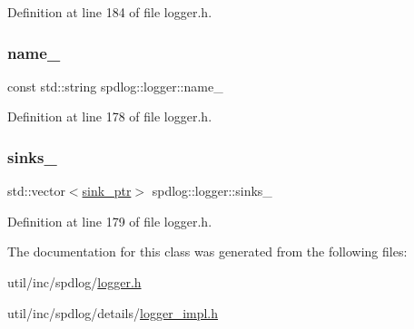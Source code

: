 Definition at line 184 of file logger.\+h.

\mbox{\label{classspdlog_1_1logger_aad05282c338eb617ca260e40ab8134bc}} 
\subsubsection{\texorpdfstring{name\+\_\+}{name\_}}
{\footnotesize\ttfamily const std\+::string spdlog\+::logger\+::name\+\_\+\hspace{0.3cm}{\ttfamily [protected]}}



Definition at line 178 of file logger.\+h.

\mbox{\label{classspdlog_1_1logger_a24a3b3250f3fe52fa7c3053e77076f07}} 
\subsubsection{\texorpdfstring{sinks\+\_\+}{sinks\_}}
{\footnotesize\ttfamily std\+::vector$<$\hyperlink{namespacespdlog_a422c57d3088160b517e5a74e5f318253}{sink\+\_\+ptr}$>$ spdlog\+::logger\+::sinks\+\_\+\hspace{0.3cm}{\ttfamily [protected]}}



Definition at line 179 of file logger.\+h.



The documentation for this class was generated from the following files\+:\begin{DoxyCompactItemize}
\item 
util/inc/spdlog/\hyperlink{logger_8h}{logger.\+h}\item 
util/inc/spdlog/details/\hyperlink{logger__impl_8h}{logger\+\_\+impl.\+h}\end{DoxyCompactItemize}
